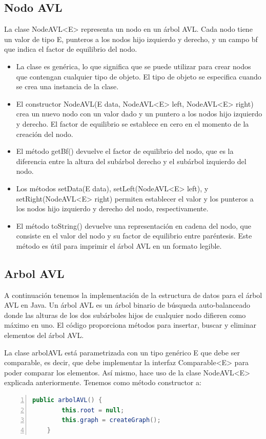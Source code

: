 \documentclass{article}
\begin{document}
            \subsection{Nodo AVL}
                La clase NodeAVL<E> representa un nodo en un árbol AVL. Cada nodo tiene un valor de tipo E, punteros a los nodos hijo izquierdo y derecho, y un campo bf que indica el factor de equilibrio del nodo.
                \begin{itemize}
                    \item La clase es genérica, lo que significa que se puede utilizar para crear nodos que contengan cualquier tipo de objeto. El tipo de objeto se especifica cuando se crea una instancia de la clase.
                    \item El constructor NodeAVL(E data, NodeAVL<E> left, NodeAVL<E> right) crea un nuevo nodo con un valor dado y un puntero a los nodos hijo izquierdo y derecho. El factor de equilibrio se establece en cero en el momento de la creación del nodo.
                    \item El método getBf() devuelve el factor de equilibrio del nodo, que es la diferencia entre la altura del subárbol derecho y el subárbol izquierdo del nodo.
                    \item Los métodos setData(E data), setLeft(NodeAVL<E> left), y setRight(NodeAVL<E> right) permiten establecer el valor y los punteros a los nodos hijo izquierdo y derecho del nodo, respectivamente.
                    \item El método toString() devuelve una representación en cadena del nodo, que consiste en el valor del nodo y su factor de equilibrio entre paréntesis. Este método es útil para imprimir el árbol AVL en un formato legible.
                \end{itemize}
            \subsection{Arbol AVL}
                A continuación tenemos la implementación de la estructura de datos para el árbol AVL en Java. Un árbol AVL es un árbol binario de búsqueda auto-balanceado donde las alturas de los dos subárboles hijos de cualquier nodo difieren como máximo en uno. El código proporciona métodos para insertar, buscar y eliminar elementos del árbol AVL.

                La clase arbolAVL está parametrizada con un tipo genérico E que debe ser comparable, es decir, que debe implementar la interfaz Comparable<E> para poder comparar los elementos. Así mismo, hace uso de la clase NodeAVL<E> explicada anteriormente. Tenemos como método constructor a:
                    \begin{lstlisting}[language=Java, caption=Método constructor arbolAVL()), numbers=left]
    public arbolAVL() {
        this.root = null;
        this.graph = createGraph();
    }
                    \end{lstlisting}    
\end{document}
